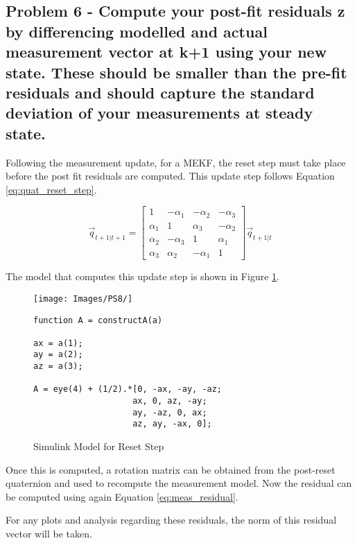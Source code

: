 \subsection{Problem 6 - Compute your post-fit residuals z by differencing modelled and actual measurement vector at k+1 using your new state. These should be smaller than the pre-fit residuals and should capture the standard deviation of your measurements at steady state.}

Following the measurement update, for a MEKF, the reset step must take place before the post fit residuals are computed. This update step follows Equation \ref{eq:quat_reset_step}.

\begin{equation} \label{eq:quat_reset_step}
    \vec{q}_{t+1 \vert t+1} = \begin{bmatrix}
        1 & -\alpha_1 & -\alpha_2 & -\alpha_3 \\
        \alpha_1 & 1 & \alpha_3 & -\alpha_2 \\
        \alpha_2 & -\alpha_3 & 1 & \alpha_1 \\
        \alpha_3 & \alpha_2 & -\alpha_1 & 1
    \end{bmatrix} \vec{q}_{t+1 \vert t}
\end{equation}

The model that computes this update step is shown in Figure \ref{fig:quat_reset_step}.

\begin{figure}[H]
    \centering
    \captionsetup{ justification = centering }
    \texttt{[image: Images/PS8/]}
    \begin{lstlisting}
function A = constructA(a)

ax = a(1);
ay = a(2);
az = a(3);

A = eye(4) + (1/2).*[0, -ax, -ay, -az;
                    ax, 0, az, -ay;
                    ay, -az, 0, ax;
                    az, ay, -ax, 0];
    \end{lstlisting}
    \caption{Simulink Model for Reset Step}
    \label{fig:quat_reset_step}
\end{figure}

Once this is computed, a rotation matrix can be obtained from the post-reset quaternion and used to recompute the measurement model. Now the residual can be computed using again Equation \ref{eq:meas_residual}.

For any plots and analysis regarding these residuals, the norm of this residual vector will be taken.

